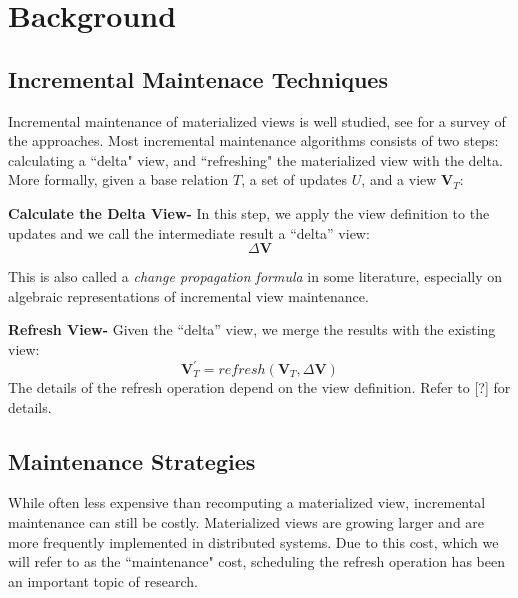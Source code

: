 \section{Background}\label{sec-background}

\subsection{Incremental Maintenace Techniques}
Incremental maintenance of materialized views is well studied, see \cite{chirkova2011materialized} for a survey of the approaches. 
Most incremental maintenance algorithms consists of two steps: calculating a ``delta" view,
and ``refreshing" the materialized view with the delta.
More formally, given a base relation $T$, a set of updates $U$,
and a view $\textbf{V}_{T}$:

\textbf{Calculate the Delta View- }
In this step, we apply the view definition to the updates and we call
the intermediate result a ``delta'' view:
\[
\Delta\textbf{V}
\]

This is also called a \emph{change propagation formula} in some literature,
especially on algebraic representations of incremental view maintenance.

\textbf{Refresh View- }
Given the ``delta'' view, we merge the results with the existing
view:
\[
\textbf{V}_{T}^{'}=refresh(\textbf{V}_{T},\Delta\textbf{V})
\] 
The details of the refresh operation depend on the view definition.
Refer to [?] for details.


\subsection{Maintenance Strategies}
While often less expensive than recomputing a materialized view,
incremental maintenance can still be costly.
Materialized views are growing larger and are more frequently 
implemented in distributed systems.
Due to this cost, which we will refer to as the ``maintenance" cost, 
scheduling the refresh operation has been an important topic of research.

